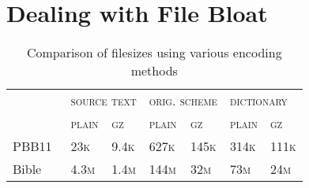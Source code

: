 \chapter{Dealing with File Bloat}\label{ch:bloat}

\begin{table}
    \myfloatalign
  \begin{tabularx}{\textwidth}{lXXXXXX} %
    & \multicolumn{2}{l}{\textsc{source text}} & \multicolumn{2}{l}{\textsc{orig. scheme}} & \multicolumn{2}{l}{\textsc{dictionary}} \\
    & \textsc{plain} & \textsc{gz} & \textsc{plain} & \textsc{gz} & \textsc{plain} & \textsc{gz} \\ \midrule
    PBB11~\cite{Pinkney2011} & 23\textsc{k} & 9.4\textsc{k} & 627\textsc{k} & 145\textsc{k} & 314\textsc{k} & 111\textsc{k} \\ \midrule
    Bible & 4.3\textsc{m} & 1.4\textsc{m} & 144\textsc{m} & 32\textsc{m} & 73\textsc{m} & 24\textsc{m} \\ 
    \bottomrule
  \end{tabularx}
  \caption[Comparison of filesizes]{Comparison of filesizes using various encoding methods}  \label{tab:filesize}
\end{table}